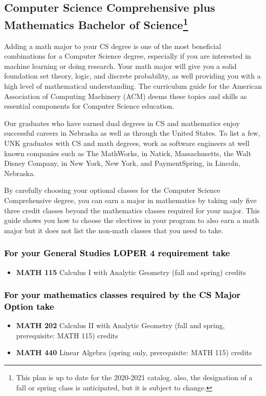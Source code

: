 \documentclass[10pt]{article}
\newcommand{\calcone}{\textbf{MATH 115} Calculus I with Analytic Geometry (fall and spring) \dotfill 5 credits}
\newcommand{\calctwo}{\textbf{MATH 202} Calculus II with Analytic Geometry (fall and spring, prerequisite: MATH 115) \dotfill 5 credits }
\newcommand{\linear}{\textbf{MATH 440} Linear Algebra (spring only, prerequisite: MATH 115) \dotfill 3 credits}
\begin{document}
\subsection*{\textbf{\textcolor{unkblue}{Computer Science Comprehensive plus Mathematics Bachelor of Science\footnote[1]{This plan is up to date for the 2020-2021 catalog. also, the designation of a fall or spring class is anticipated, but it is subject to change.
}}}}

Adding a math major to your CS degree is one of the most beneficial combinations for a Computer Science degree, especially if you are interested in machine learning or doing research.  Your math major  will give you a solid foundation set theory, logic, and discrete probability, as well providing you with a high level of mathematical understanding.   The curriculum guide for the American Association of Computing Machinery (ACM) deems  these topics and skills  as essential components for  Computer Science education.

Our graduates who have  earned dual degrees in CS and mathematics enjoy successful careers in Nebraska as well as through the United States.  To list a few, UNK graduates with CS and math degrees, work as software engineers at well known companies such as The MathWorks, in Natick, Massachusetts, the Walt Disney Company, in New York, New York, and PaymentSpring, in Lincoln, Nebraska.

By carefully choosing your optional classes for the Computer Science Comprehensive degree, you can earn a major in mathematics by taking only five three credit classes beyond the mathematics classes required for your major. This guide shows you how to choose the electives in your program to also earn a math major but it does not list the non-math classes that you need to take.



\subsubsection*{\textcolor{black}{For  your General Studies LOPER 4 requirement take}}
\begin{itemize}
\item \calcone
\end{itemize}


\subsubsection*{\textcolor{black}{For your mathematics classes required by the CS Major Option take}}
\begin{itemize}
\item \calctwo
\item \linear
\end{itemize}
\end{document}
